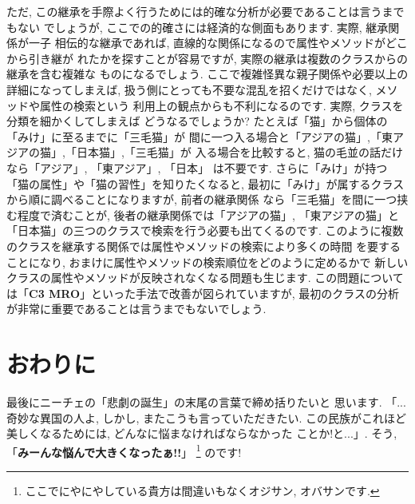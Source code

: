 ただ, この継承を手際よく行うためには的確な分析が必要であることは言うまでもない
でしょうが, ここでの的確さには経済的な側面もあります. 実際, 継承関係が一子
相伝的な継承であれば, 直線的な関係になるので属性やメソッドがどこから引き継が
れたかを探すことが容易ですが, 実際の継承は複数のクラスからの継承を含む複雑な
ものになるでしょう. ここで複雑怪異な親子関係や必要以上の詳細になってしまえば,
 扱う側にとっても不要な混乱を招くだけではなく, メソッドや属性の検索という
利用上の観点からも不利になるのです. 実際, クラスを分類を細かくしてしまえば
どうなるでしょうか?  たとえば「猫」から個体の「みけ」に至るまでに「三毛猫」が
間に一つ入る場合と「アジアの猫」,「東アジアの猫」,「日本猫」,「三毛猫」が
入る場合を比較すると, 猫の毛並の話だけなら「アジア」, 「東アジア」, 「日本」
は不要です. さらに「みけ」が持つ「猫の属性」や「猫の習性」を知りたくなると,
 最初に「みけ」が属するクラスから順に調べることになりますが, 前者の継承関係
なら「三毛猫」を間に一つ挟む程度で済むことが, 後者の継承関係では「アジアの猫」,
 「東アジアの猫」と「日本猫」の三つのクラスで検索を行う必要も出てくるのです.
 このように複数のクラスを継承する関係では属性やメソッドの検索により多くの時間
を要することになり, おまけに属性やメソッドの検索順位をどのように定めるかで
新しいクラスの属性やメソッドが反映されなくなる問題も生じます. この問題について
は「\textbf{C3 MRO}」といった手法で改善が図られていますが, 最初のクラスの分析
が非常に重要であることは言うまでもないでしょう.

\section{おわりに}

最後にニーチェの「悲劇の誕生」\cite{悲劇の誕生}の末尾の言葉で締め括りたいと
思います. 「...奇妙な異国の人よ, しかし, またこうも言っていただきたい.
 この民族がこれほど美しくなるためには, どんなに悩まなければならなかった
ことか!と...」. そう, 「\textbf{みーんな悩んで大きくなったぁ!!}」\cite{野坂}
\footnote{ここでにやにやしている貴方は間違いもなくオジサン, オバサンです.}
のです!


